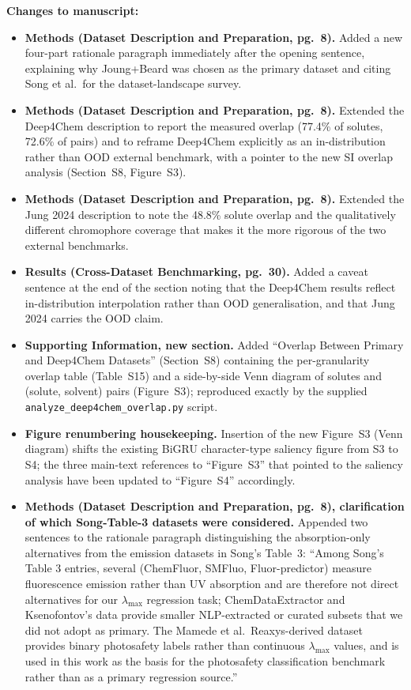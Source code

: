 \documentclass[11pt]{article}
\newenvironment{changes}{%
  \noindent\textbf{Changes to manuscript:}
  \begin{itemize}[leftmargin=2em,itemsep=2pt]}{%
  \end{itemize}\medskip}
\begin{document}
\begin{changes}
  \item \textbf{Methods (Dataset Description and Preparation, pg.\ 8).} Added a new four-part rationale paragraph immediately after the opening sentence, explaining why Joung+Beard was chosen as the primary dataset and citing Song et al.\ for the dataset-landscape survey.
  \item \textbf{Methods (Dataset Description and Preparation, pg.\ 8).} Extended the Deep4Chem description to report the measured overlap (77.4\% of solutes, 72.6\% of pairs) and to reframe Deep4Chem explicitly as an in-distribution rather than OOD external benchmark, with a pointer to the new SI overlap analysis (Section~S8, Figure~S3).
  \item \textbf{Methods (Dataset Description and Preparation, pg.\ 8).} Extended the Jung 2024 description to note the 48.8\% solute overlap and the qualitatively different chromophore coverage that makes it the more rigorous of the two external benchmarks.
  \item \textbf{Results (Cross-Dataset Benchmarking, pg.\ 30).} Added a caveat sentence at the end of the section noting that the Deep4Chem results reflect in-distribution interpolation rather than OOD generalisation, and that Jung 2024 carries the OOD claim.
  \item \textbf{Supporting Information, new section.} Added ``Overlap Between Primary and Deep4Chem Datasets'' (Section~S8) containing the per-granularity overlap table (Table~S15) and a side-by-side Venn diagram of solutes and (solute, solvent) pairs (Figure~S3); reproduced exactly by the supplied \texttt{analyze\_deep4chem\_overlap.py} script.
  \item \textbf{Figure renumbering housekeeping.} Insertion of the new Figure~S3 (Venn diagram) shifts the existing BiGRU character-type saliency figure from S3 to S4; the three main-text references to ``Figure~S3'' that pointed to the saliency analysis have been updated to ``Figure~S4'' accordingly.
  \item \textbf{Methods (Dataset Description and Preparation, pg.\ 8), clarification of which Song-Table-3 datasets were considered.} Appended two sentences to the rationale paragraph distinguishing the absorption-only alternatives from the emission datasets in Song's Table~3: ``Among Song's Table 3 entries, several (ChemFluor, SMFluo, Fluor-predictor) measure fluorescence emission rather than UV absorption and are therefore not direct alternatives for our $\lambda_{\max}$ regression task; ChemDataExtractor and Ksenofontov's data provide smaller NLP-extracted or curated subsets that we did not adopt as primary. The Mamede et al.\ Reaxys-derived dataset provides binary photosafety labels rather than continuous $\lambda_{\max}$ values, and is used in this work as the basis for the photosafety classification benchmark rather than as a primary regression source.''
\end{changes}
\end{document}

